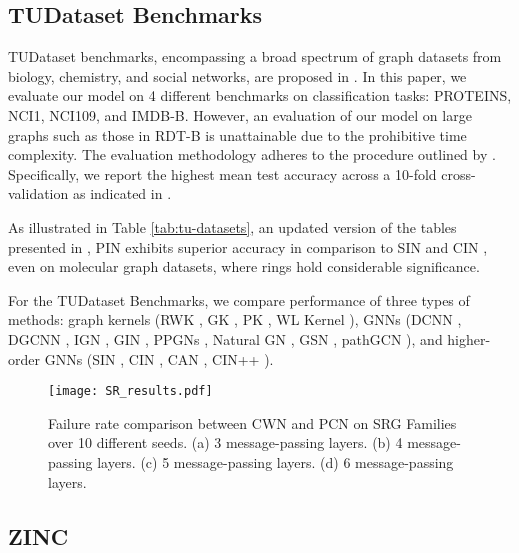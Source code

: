 \documentclass[letterpaper]{article} \usepackage{aaai24}  \usepackage{times}  \usepackage{helvet}  \usepackage{courier}  \usepackage[hyphens]{url}  \usepackage{graphicx} \urlstyle{rm} \def\UrlFont{\rm}  \usepackage{natbib}  \usepackage{caption} \frenchspacing  \setlength{\pdfpagewidth}{8.5in} \setlength{\pdfpageheight}{11in} \usepackage{algorithm}
\begin{document}
\subsection{TUDataset Benchmarks} \label{subsec:tudataset}
TUDataset benchmarks, encompassing a broad spectrum of graph datasets from biology, chemistry, and social networks, are proposed in \cite{morris_tudataset_2020}. In this paper, we evaluate our model on 4 different benchmarks on classification tasks: PROTEINS, NCI1, NCI109, and IMDB-B. However, an evaluation of our model on large graphs such as those in RDT-B is unattainable due to the prohibitive time complexity. The evaluation methodology adheres to the procedure outlined by  \cite{xu_how_2019}. Specifically, we report the highest mean test accuracy across a 10-fold cross-validation as indicated in \cite{xu_how_2019}.

As illustrated in Table \ref{tab:tu-datasets}, an updated version of the tables presented in \cite{bodnar_weisfeiler_2022, giusti_cin_2023}, PIN exhibits superior accuracy in comparison to SIN \cite{bodnar_weisfeiler_2021} and CIN \cite{bodnar_weisfeiler_2022}, even on molecular graph datasets, where rings hold considerable significance.

For the TUDataset Benchmarks, we compare performance of three types of methods: graph kernels (RWK \cite{gartner_on_graph_2003}, GK \cite{sherashidze_efficient_2009}, PK \cite{neumann_propagation_2016}, WL Kernel \cite{shervashidze_wl_kernels_2011}), GNNs (DCNN \cite{atwood_diffusion_convolution_2016}, DGCNN \cite{zhang_end_to_end_2018}, IGN \cite{maron_invariant_2019}, GIN \cite{xu_how_2019}, PPGNs \cite{maron_provably_2019}, Natural GN \cite{dehaan_natural_2020}, GSN \cite{bouritsas_improving_2021}, pathGCN \cite{eliasof_pathgcn_2022}), and higher-order GNNs (SIN \cite{bodnar_weisfeiler_2021}, CIN \cite{bodnar_weisfeiler_2022}, CAN \cite{giusti_cell_2022}, CIN++ \cite{giusti_cin_2023}).

\begin{figure*}[t]
    \centering
    \texttt{[image: SR\_results.pdf]}
    \caption{Failure rate comparison between CWN and PCN on SRG Families over 10 different seeds. (a) 3 message-passing layers. (b) 4 message-passing layers. (c) 5 message-passing layers. (d) 6 message-passing layers.}
    \label{fig:sr-graphs}
\end{figure*}

\subsection{ZINC} \label{subsec:zinc}
\end{document}
